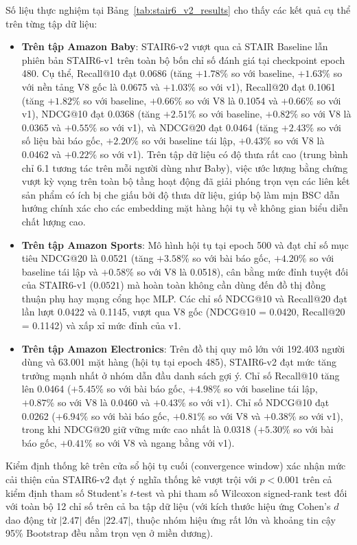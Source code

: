 Số liệu thực nghiệm tại Bảng~\ref{tab:stair6_v2_results} cho thấy các kết quả cụ thể trên từng tập dữ liệu:
\begin{itemize}
    \item \textbf{Trên tập Amazon Baby}: STAIR6-v2 vượt qua cả STAIR Baseline lẫn phiên bản STAIR6-v1 trên toàn bộ bốn chỉ số đánh giá tại checkpoint epoch 480. Cụ thể, Recall@10 đạt 0.0686 (tăng $+1.78\%$ so với baseline, $+1.63\%$ so với nền tảng V8 gốc là 0.0675 và $+1.03\%$ so với v1), Recall@20 đạt 0.1061 (tăng $+1.82\%$ so với baseline, $+0.66\%$ so với V8 là 0.1054 và $+0.66\%$ so với v1), NDCG@10 đạt 0.0368 (tăng $+2.51\%$ so với baseline, $+0.82\%$ so với V8 là 0.0365 và $+0.55\%$ so với v1), và NDCG@20 đạt 0.0464 (tăng $+2.43\%$ so với số liệu bài báo gốc, $+2.20\%$ so với baseline tái lập, $+0.43\%$ so với V8 là 0.0462 và $+0.22\%$ so với v1). Trên tập dữ liệu có độ thưa rất cao (trung bình chỉ 6.1 tương tác trên mỗi người dùng như Baby), việc ước lượng bằng chứng vượt kỳ vọng trên toàn bộ tầng hoạt động đã giải phóng trọn vẹn các liên kết sản phẩm có ích bị che giấu bởi độ thưa dữ liệu, giúp bộ làm mịn BSC dẫn hướng chính xác cho các embedding mặt hàng hội tụ về không gian biểu diễn chất lượng cao.
    \item \textbf{Trên tập Amazon Sports}: Mô hình hội tụ tại epoch 500 và đạt chỉ số mục tiêu NDCG@20 là 0.0521 (tăng $+3.58\%$ so với bài báo gốc, $+4.20\%$ so với baseline tái lập và $+0.58\%$ so với V8 là 0.0518), cân bằng mức đỉnh tuyệt đối của STAIR6-v1 ($0.0521$) mà hoàn toàn không cần dùng đến đồ thị đồng thuận phụ hay mạng cổng học MLP. Các chỉ số NDCG@10 và Recall@20 đạt lần lượt 0.0422 và 0.1145, vượt qua V8 gốc (NDCG@10 = 0.0420, Recall@20 = 0.1142) và xấp xỉ mức đỉnh của v1.
    \item \textbf{Trên tập Amazon Electronics}: Trên đồ thị quy mô lớn với 192.403 người dùng và 63.001 mặt hàng (hội tụ tại epoch 485), STAIR6-v2 đạt mức tăng trưởng mạnh nhất ở nhóm dẫn đầu danh sách gợi ý. Chỉ số Recall@10 tăng lên 0.0464 ($+5.45\%$ so với bài báo gốc, $+4.98\%$ so với baseline tái lập, $+0.87\%$ so với V8 là 0.0460 và $+0.43\%$ so với v1). Chỉ số NDCG@10 đạt 0.0262 ($+6.94\%$ so với bài báo gốc, $+0.81\%$ so với V8 và $+0.38\%$ so với v1), trong khi NDCG@20 giữ vững mức cao nhất là 0.0318 ($+5.30\%$ so với bài báo gốc, $+0.41\%$ so với V8 và ngang bằng với v1).
\end{itemize}

Kiểm định thống kê trên cửa sổ hội tụ cuối (convergence window) xác nhận mức cải thiện của STAIR6-v2 đạt ý nghĩa thống kê vượt trội với $p < 0.001$ trên cả kiểm định tham số Student's $t$-test và phi tham số Wilcoxon signed-rank test đối với toàn bộ 12 chỉ số trên cả ba tập dữ liệu (với kích thước hiệu ứng Cohen's $d$ dao động từ $|2.47|$ đến $|22.47|$, thuộc nhóm hiệu ứng rất lớn và khoảng tin cậy 95\% Bootstrap đều nằm trọn vẹn ở miền dương).


